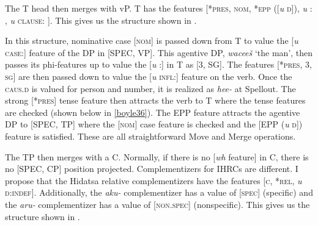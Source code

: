 \documentclass[output=paper]{LSP/langsci}
\begin{document}
The T head then merges with vP. T has the features [\textsc{*pres, nom, *epp} ([\textit{u} \textsc{d}]), \textit{u} : , \textit{u} \textsc{clause}: ]. This gives us the structure shown in .

\ea \label{boyle35}
{\hspace{1em}}\newline

\z

In this structure, nominative case [\textsc{nom}] is passed down from T to value the [\textit{u} \textsc{case}:] feature of the DP in [SPEC, VP]. This agentive DP, \textit{wacee\v{s}} `the man', then passes its phi-features up to value the [\textit{u} :] in T as [3, SG].  The features [*\textsc{pres, 3, sg}] are then passed down to value the [\textit{u} \textsc{infl}:] feature on the verb. Once the \textsc{caus.d} is valued for person and number, it is realized as \textit{hee-} at Spellout. The strong [*\textsc{pres}] tense feature then attracts the verb to T where the tense features are checked (shown below in \ref{boyle36}). The EPP feature attracts the agentive DP to [SPEC, TP] where the [\textsc{nom}] case feature is checked and the [EPP (\textit{u} \textsc{d}]) feature is satisfied. These are all straightforward Move and Merge operations.
	
The TP then merges with a C. Normally, if there is no [\textit{wh} feature] in C, there is no [SPEC, CP] position projected. Complementizers for IHRCs are different.  I propose that the Hidatsa relative complementizers have the features [\textsc{c, *rel,} \textit{u} \textsc{d:indef}].  Additionally, the \textit{aku-} complementizer has a value of [\textsc{spec}] (specific) and the \textit{aru-} complementizer has a value of [\textsc{non.spec}] (nonspecific). This gives us the structure shown in .
\end{document}
